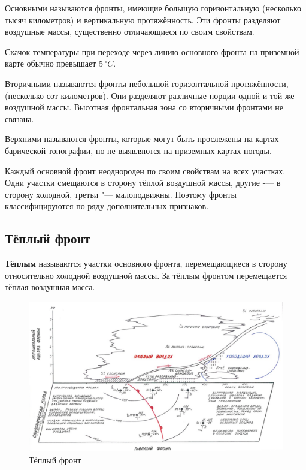\documentclass[a4paper, 12pt, twoside, draft, book, russian, fittopage, cyremdash, openright]{ncc}
\newcommand{\grC}{\ensuremath{\,^\circ{}C}\xspace}
\begin{document}
Основными называются фронты, имеющие большую горизонтальную
(несколько тысяч километров) и вертикальную протяжённость. Эти фронты
разделяют воздушные массы, существенно отличающиеся по своим
свойствам.

Скачок температуры при переходе через линию основного фронта на
приземной карте обычно превышает 5\grC.

Вторичными называются фронты небольшой горизонтальной протяжённости,
(несколько сот километров).  Они разделяют различные порции одной и
той же воздушной массы. Высотная фронтальная зона со вторичными
фронтами не связана.

Верхними называются фронты, которые могут быть прослежены на картах
барической топографии, но не выявляются на приземных картах погоды.

Каждый основной фронт неоднороден по своим свойствам на всех
участках. Одни участки смещаются в сторону тёплой воздушной массы,
другие \--— в сторону холодной, третьи "--- малоподвижны. Поэтому фронты
классифицируются по ряду дополнительных признаков.

\subsection{Тёплый фронт}
\label{sec:warm_front}

\textbf{Тёплым} называются участки основного фронта, перемещающиеся в сторону
относительно холодной воздушной массы. За тёплым фронтом перемещается
тёплая воздушная масса.

\begin{figure}[htb]
   \centering
   \includegraphics[scale=0.7]{06_warm_front.pdf}
   \caption{Тёплый фронт}
   \label{fig:06_warm_front}
\end{figure}
\end{document}

